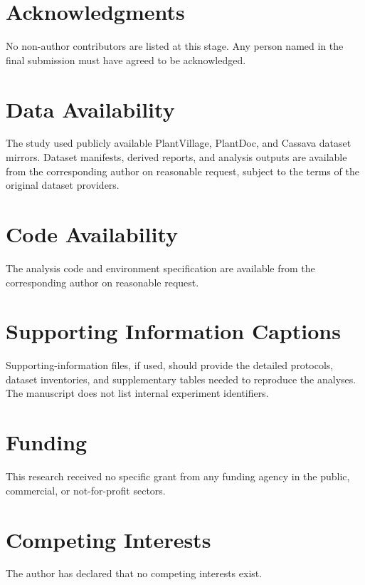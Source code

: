 \documentclass[12pt]{article}
\begin{document}
\section*{Acknowledgments}
No non-author contributors are listed at this stage. Any person named in the final submission must have agreed to be acknowledged.

\section*{Data Availability}
The study used publicly available PlantVillage, PlantDoc, and Cassava dataset mirrors. Dataset manifests, derived reports, and analysis outputs are available from the corresponding author on reasonable request, subject to the terms of the original dataset providers.

\section*{Code Availability}
The analysis code and environment specification are available from the corresponding author on reasonable request.

\section*{Supporting Information Captions}
Supporting-information files, if used, should provide the detailed protocols, dataset inventories, and supplementary tables needed to reproduce the analyses. The manuscript does not list internal experiment identifiers.

\section*{Funding}
This research received no specific grant from any funding agency in the public, commercial, or not-for-profit sectors.

\section*{Competing Interests}
The author has declared that no competing interests exist.
\end{document}
